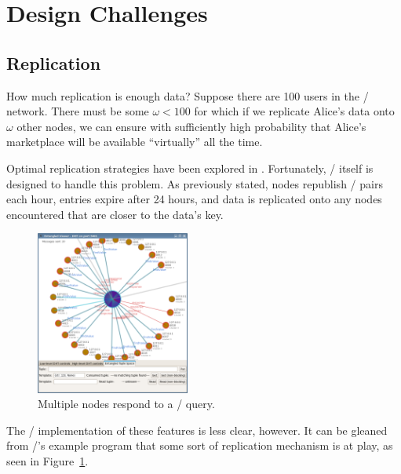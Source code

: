 \documentclass[11pt,twocolumn]{article}
\begin{document}
\section{Design Challenges}

\subsection{Replication}
\label{subsec:design_challenges_replication}

How much replication is enough data?
Suppose there are 100 users in the \OpenBazaar/ network.
There must be some $\omega < 100$ for which if we replicate Alice's data onto $\omega$ other nodes, we can ensure with sufficiently high probability that Alice's marketplace will be available ``virtually'' all the time.

Optimal replication strategies have been explored in \cite{cohen}.
Fortunately, \Kademlia/ itself is designed to handle this problem.
As previously stated, nodes republish \kv/ pairs each hour, entries expire after 24 hours, and data is replicated onto any nodes encountered that are closer to the data's key.

\begin{figure}[h!]
  \centering
  \includegraphics[width=0.45\textwidth]{images/entangled_replication}
  \caption{\label{entangled_replication}Multiple nodes respond to a \findValue/ query.}
\end{figure}

The \Entangled/ implementation of these features is less clear, however.
It can be gleaned from \Entangled/'s example program that some sort of replication mechanism is at play, as seen in Figure~\ref{entangled_replication}.
\end{document}
